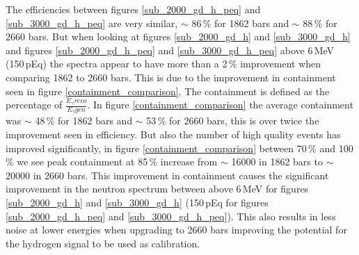 \documentclass[12pt,a4paper]{article}
\begin{document}
The efficiencies between figures \ref{sub_2000_gd_h_peq} and \ref{sub_3000_gd_h_peq} are very similar, $\sim$ 86\,\% for 1862 bars and $\sim$ 88\,\% for 2660 bars. But when looking at figures \ref{sub_2000_gd_h} and \ref{sub_3000_gd_h} and figures \ref{sub_2000_gd_h_peq} and \ref{sub_3000_gd_h_peq} above 6\,MeV (150\,pEq) the spectra appear to have more than a 2\,\% improvement when comparing 1862 to 2660 bars. This is due to the improvement in containment seen in figure \ref{containment_comparison}. The containment is defined as the percentage of $\frac{E_\gamma reco}{E_\gamma gen}$. In figure \ref{containment_comparison} the average containment was $\sim$ 48\,\% for 1862 bars and $\sim$ 53\,\% for 2660 bars, this is over twice the improvement seen in efficiency. But also the number of high quality events has improved significantly, in figure \ref{containment_comparison} between 70\,\% and 100\,\% we see peak containment at 85\,\% increase from $\sim$ 16000 in 1862 bars to $\sim$ 20000 in 2660 bars. This improvement in containment causes the significant improvement in the neutron spectrum between above 6\,MeV for figures \ref{sub_2000_gd_h} and \ref{sub_3000_gd_h} (150\,pEq for figures \ref{sub_2000_gd_h_peq} and \ref{sub_3000_gd_h_peq}). This also results in less noise at lower energies when upgrading to 2660 bars improving the potential for the hydrogen signal to be used as calibration. 
\end{document}
